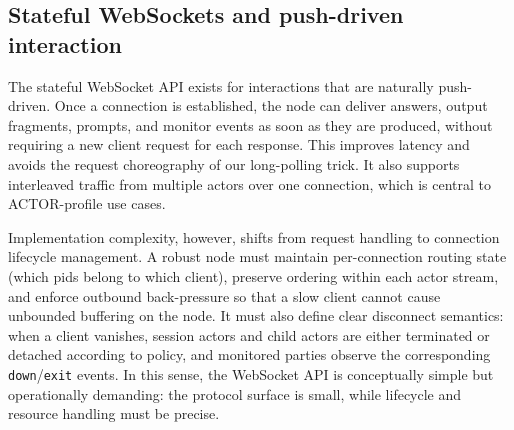 \subsection{Stateful WebSockets and push-driven interaction}\label{sec:websocket-notes}

The stateful WebSocket API exists for interactions that are naturally push-driven. Once a connection is established, the node can deliver answers, output fragments, prompts, and monitor events as soon as they are produced, without requiring a new client request for each response. This improves latency and avoids the request choreography of our long-polling trick. It also supports interleaved traffic from multiple actors over one connection, which is central to ACTOR-profile use cases.

Implementation complexity, however, shifts from request handling to connection lifecycle management. A robust node must maintain per-connection routing state (which pids belong to which client), preserve ordering within each actor stream, and enforce outbound back-pressure so that a slow client cannot cause unbounded buffering on the node. It must also define clear disconnect semantics: when a client vanishes, session actors and child actors are either terminated or detached according to policy, and monitored parties observe the corresponding \texttt{down}/\texttt{exit} events. In this sense, the WebSocket API is conceptually simple but operationally demanding: the protocol surface is small, while lifecycle and resource handling must be precise.



%
%

